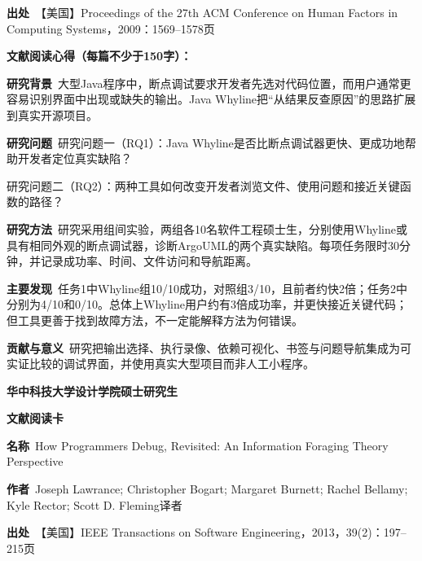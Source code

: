 \noindent\textbf{出处}\ 【美国】Proceedings of the 27th ACM Conference on Human Factors in Computing Systems，2009：1569–1578\quad 页\par
\vspace{0.35em}
\noindent\textbf{文献阅读心得（每篇不少于150字）：}\par
\noindent\textbf{研究背景}\ 大型Java程序中，断点调试要求开发者先选对代码位置，而用户通常更容易识别界面中出现或缺失的输出。Java Whyline把“从结果反查原因”的思路扩展到真实开源项目。\par
\noindent\textbf{研究问题}\ 研究问题一（RQ1）：Java Whyline是否比断点调试器更快、更成功地帮助开发者定位真实缺陷？\par
研究问题二（RQ2）：两种工具如何改变开发者浏览文件、使用问题和接近关键函数的路径？\par
\noindent\textbf{研究方法}\ 研究采用组间实验，两组各10名软件工程硕士生，分别使用Whyline或具有相同外观的断点调试器，诊断ArgoUML的两个真实缺陷。每项任务限时30分钟，并记录成功率、时间、文件访问和导航距离。\par
\noindent\textbf{主要发现}\ 任务1中Whyline组10/10成功，对照组3/10，且前者约快2倍；任务2中分别为4/10和0/10。总体上Whyline用户约有3倍成功率，并更快接近关键代码；但工具更善于找到故障方法，不一定能解释方法为何错误。\par
\noindent\textbf{贡献与意义}\ 研究把输出选择、执行录像、依赖可视化、书签与问题导航集成为可实证比较的调试界面，并使用真实大型项目而非人工小程序。\par
\clearpage
\begin{center}
{\songti\bfseries\fontsize{18.5pt}{27.75pt}\selectfont 华中科技大学设计学院硕士研究生\par}
{\songti\bfseries\fontsize{18.5pt}{27.75pt}\selectfont 文献阅读卡\par}
\end{center}
\vspace{0.25em}
\noindent\underline{}\par
\vspace{0.35em}
\noindent\textbf{名称}\ How Programmers Debug, Revisited: An Information Foraging Theory Perspective\par
\noindent\textbf{作者}\ Joseph Lawrance; Christopher Bogart; Margaret Burnett; Rachel Bellamy; Kyle Rector; Scott D. Fleming\quad 译者\par
\noindent\textbf{出处}\ 【美国】IEEE Transactions on Software Engineering，2013，39(2)：197–215\quad 页\par
